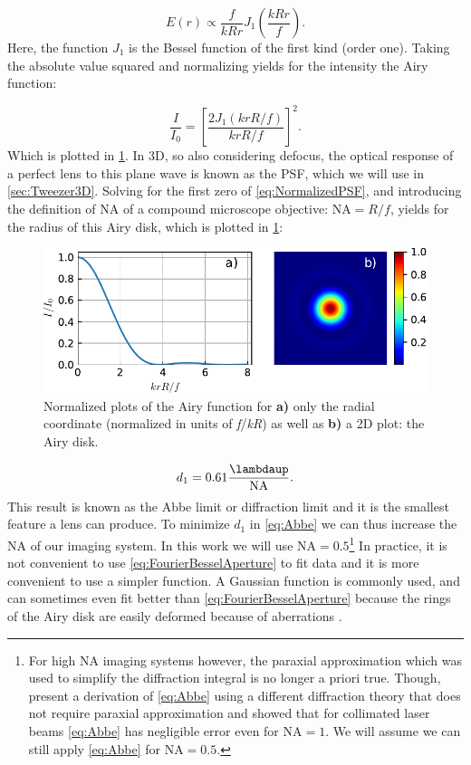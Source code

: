 \begin{equation}\label{eq:AiryField}
    E(r) \propto \frac{f}{kRr} J_1\left(\frac{k R r}{f}\right).
\end{equation}
Here, the function $J_1$ is the Bessel function of the first kind (order one).
Taking the absolute value squared and normalizing yields for the intensity the Airy function:

\begin{equation}\label{eq:NormalizedPSF}
    \frac{I}{I_0} = \left[
    \frac{2J_1(k r R/f)}{k r R/f}
    \right]^2.
\end{equation}
Which is plotted in \cref{fig:AiryPlots}.
In 3D, so also considering defocus, the optical response of a perfect lens to this plane wave is known as the \ac{PSF}, which we will use in \cref{sec:Tweezer3D}.
Solving for the first zero of \cref{eq:NormalizedPSF}, and introducing the definition of \ac{NA} of a compound microscope objective: $\text{NA} = R/f$, yields for the radius of this Airy disk, which is plotted in \cref{fig:AiryPlots}:

\begin{figure}
    \centering
    \includegraphics[width = 0.9\linewidth]{figures/AiryDisk.pdf}
    \caption{Normalized plots of the Airy function for \textbf{a)} only the radial coordinate (normalized in units of \textit{f}/\textit{kR}) as well as \textbf{b)} a 2D plot: the Airy disk.}
    \label{fig:AiryPlots}
\end{figure}

\begin{equation}\label{eq:Abbe}
    d_1 = 0.61 \frac{\lambdaup}{\text{NA}}.
\end{equation}
This result is known as the Abbe limit or diffraction limit \cite{Abbe1882} and it is the smallest feature a lens can produce.
To minimize $d_1$ in \cref{eq:Abbe} we can thus increase the \ac{NA} of our imaging system. 
In this work we will use $\text{NA} = 0.5$\footnote{For high NA imaging systems however, the paraxial approximation which was used to simplify the diffraction integral is no longer a priori true. 
Though, \cite{Chon2007} present a derivation of \cref{eq:Abbe} using a different diffraction theory that does not require paraxial approximation and showed that for collimated laser beams \cref{eq:Abbe} has negligible error even for $\text{NA} = 1$. 
We will assume we can still apply \cref{eq:Abbe} for $\text{NA} = 0.5$.}
In practice, it is not convenient to use \cref{eq:FourierBesselAperture} to fit data and it is more convenient to use a simpler function. 
A Gaussian function is commonly used, and can sometimes even fit better than \cref{eq:FourierBesselAperture} because the rings of the Airy disk are easily deformed because of aberrations \cite{Knottnerus2018}. 

